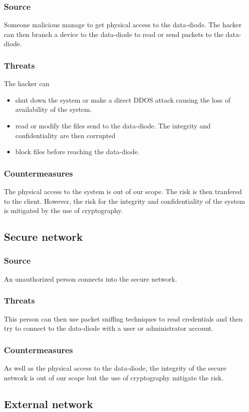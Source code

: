 \documentclass[a4paper,11pt]{article}
\begin{document}
\subsubsection{Source}
Someone malicious manage to get physical access to the data-diode. The hacker can then branch a device to the data-diode to read or send packets to the data-diode.
\subsubsection{Threats}
The hacker can
\begin{itemize}
\item shut down the system or make a direct DDOS attack causing the loss of availability of the system.
\item read or modify the files send to the data-diode. The integrity and confidentiality are then corrupted
\item block files before reaching the data-diode.
\end{itemize}
\subsubsection{Countermeasures}
The physical access to the system is out of our scope. The risk is then tranfered to the client. However, the risk for the integrity and confidentiality of the system is mitigated by the use of cryptography.
\subsection{Secure network}
\subsubsection{Source}
An unauthorized person connects into the secure network.
\subsubsection{Threats}
This person can then use packet sniffing techniques to read credentials and then try to connect to the data-diode with a user or administrator account.
\subsubsection{Countermeasures}
As well as the physical access to the data-diode, the integrity of the secure network is out of our scope but the use of cryptography mitigate the risk.
\subsection{External network}
\end{document}
